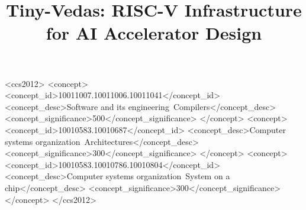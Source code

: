 \documentclass[sigplan,anonymous,review,nonacm]{acmart}
\title{Tiny-Vedas: {RISC-V} Infrastructure for {AI} Accelerator Design}
\begin{document}
\begin{abstract}

\end{abstract}

\begin{CCSXML}
<ccs2012>
 <concept>
  <concept_id>10011007.10011006.10011041</concept_id>
  <concept_desc>Software and its engineering~Compilers</concept_desc>
  <concept_significance>500</concept_significance>
 </concept>
 <concept>
  <concept_id>10010583.10010687</concept_id>
  <concept_desc>Computer systems organization~Architectures</concept_desc>
  <concept_significance>300</concept_significance>
 </concept>
 <concept>
  <concept_id>10010583.10010786.10010804</concept_id>
  <concept_desc>Computer systems organization~System on a chip</concept_desc>
  <concept_significance>300</concept_significance>
 </concept>
</ccs2012>
\end{CCSXML}


\maketitle






\appendix

\end{document}
